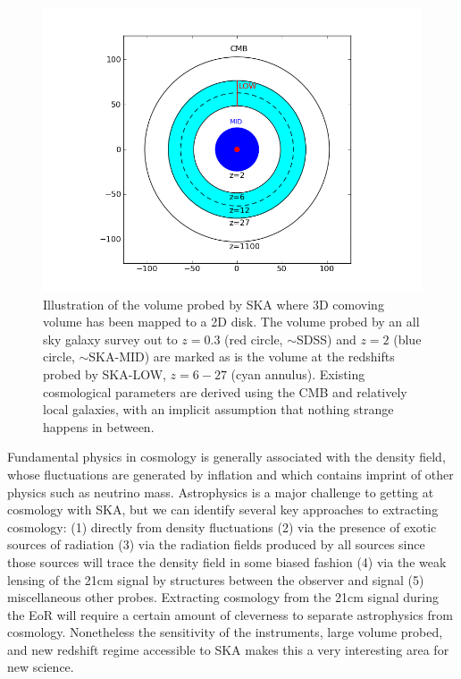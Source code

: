 \documentclass{PoS}
\begin{document}
\begin{figure}[htbp]
\begin{center}
\includegraphics[scale=0.45]{figures/volumecirc.png}
\caption{Illustration of the volume probed by SKA where 3D comoving volume has been mapped to a 2D disk. The volume probed by an all sky galaxy survey out to $z=0.3$ (red circle, $\sim$SDSS) and $z=2$ (blue circle, $\sim$SKA-MID) are marked as is the volume at the redshifts probed by SKA-LOW, $z=6-27$ (cyan annulus). Existing cosmological parameters are derived using the CMB and relatively local galaxies, with an implicit assumption that nothing strange happens in between.}
\label{fig:volume}
\end{center}
\end{figure}

Fundamental physics in cosmology is generally associated with the density field, whose fluctuations are generated by inflation and which contains imprint of other physics such as neutrino mass. Astrophysics is a major challenge to getting at cosmology with SKA, but we can identify several key approaches to extracting cosmology: (1) directly from density fluctuations (2) via the presence of exotic sources of radiation (3) via the radiation fields produced by all sources since those sources will trace the density field in some biased fashion (4) via the weak lensing of the 21cm signal by structures between the observer and signal (5) miscellaneous other probes. Extracting cosmology from the 21cm signal during the EoR will require a certain amount of cleverness to separate astrophysics from cosmology. Nonetheless the sensitivity of the instruments, large volume probed, and new redshift regime accessible to SKA makes this a very interesting area for new science. 
\end{document}
